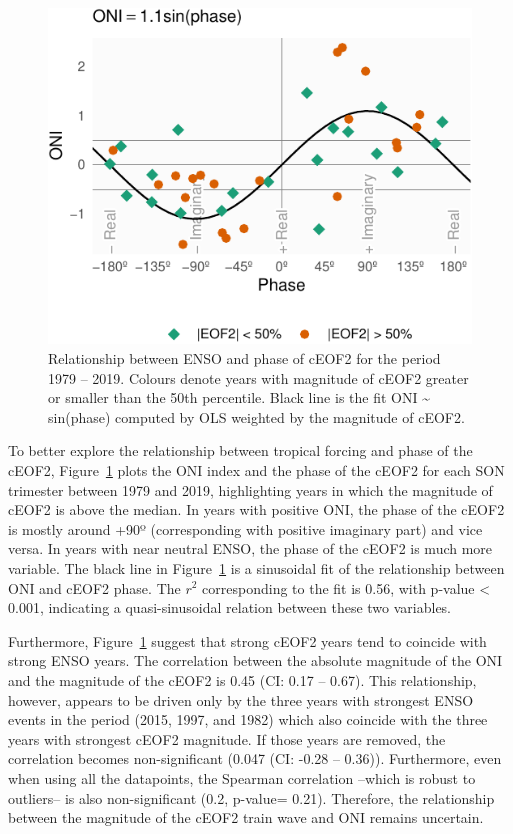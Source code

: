 \documentclass[smallextended]{svjour3}       %
\begin{document}
\begin{figure}
\centering
\includegraphics{../figures/enso-phase-1.pdf}
\caption{\label{fig:enso-phase}Relationship between ENSO and phase of cEOF2 for the period 1979 -- 2019. Colours denote years with magnitude of cEOF2 greater or smaller than the 50th percentile. Black line is the fit ONI \textasciitilde{} sin(phase) computed by OLS weighted by the magnitude of cEOF2.}
\end{figure}

To better explore the relationship between tropical forcing and phase of the cEOF2, Figure~\ref{fig:enso-phase} plots the ONI index and the phase of the cEOF2 for each SON trimester between 1979 and 2019, highlighting years in which the magnitude of cEOF2 is above the median. In years with positive ONI, the phase of the cEOF2 is mostly around +90º (corresponding with positive imaginary part) and vice versa. In years with near neutral ENSO, the phase of the cEOF2 is much more variable. The black line in Figure~\ref{fig:enso-phase} is a sinusoidal fit of the relationship between ONI and cEOF2 phase. The \(r^2\) corresponding to the fit is 0.56, with p-value \textless{} 0.001, indicating a quasi-sinusoidal relation between these two variables.

Furthermore, Figure~\ref{fig:enso-phase} suggest that strong cEOF2 years tend to coincide with strong ENSO years. The correlation between the absolute magnitude of the ONI and the magnitude of the cEOF2 is 0.45 (CI: 0.17 -- 0.67). This relationship, however, appears to be driven only by the three years with strongest ENSO events in the period (2015, 1997, and 1982) which also coincide with the three years with strongest cEOF2 magnitude. If those years are removed, the correlation becomes non-significant (0.047 (CI: -0.28 -- 0.36)). Furthermore, even when using all the datapoints, the Spearman correlation --which is robust to outliers-- is also non-significant (0.2, p-value= 0.21). Therefore, the relationship between the magnitude of the cEOF2 train wave and ONI remains uncertain.
\end{document}

